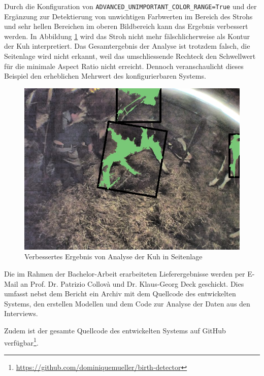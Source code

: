 Durch die Konfiguration von \texttt{ADVANCED_UNIMPORTANT_COLOR_RANGE=True} und der Ergänzung zur Detektierung von unwichtigen Farbwerten im Bereich des Strohs und sehr hellen Bereichen im oberen Bildbereich kann das Ergebnis verbessert werden. In Abbildung \ref{fig: Verbessertes Ergebnis von Analyse der Kuh in Seitenlage} wird das Stroh nicht mehr fälschlicherweise als Kontur der Kuh interpretiert. Das Gesamtergebnis der Analyse ist trotzdem falsch, die Seitenlage wird nicht erkannt, weil das umschliessende Rechteck den Schwellwert für die minimale Aspect Ratio nicht erreicht. Dennoch veranschaulicht dieses Beispiel den erheblichen Mehrwert des konfigurierbaren Systems.

\begin{figure}[H]
	\center
	\includegraphics[scale=0.5]{Grafiken/resultate/verbessertesResultat.jpg}
	\caption{Verbessertes Ergebnis von Analyse der Kuh in Seitenlage} 
	\label{fig: Verbessertes Ergebnis von Analyse der Kuh in Seitenlage} 
\end{figure}


Die im Rahmen der Bachelor-Arbeit erarbeiteten Lieferergebnisse werden per E-Mail an Prof. Dr. Patrizio Collovà und Dr. Klaus-Georg Deck geschickt. Dies umfasst nebst dem Bericht ein Archiv mit dem Quellcode des entwickelten Systems, den erstellen Modellen und dem Code zur Analyse der Daten aus den Interviews. 

Zudem ist der gesamte Quellcode des entwickelten Systems auf GitHub verfügbar\footnote{\url{https://github.com/dominiquemueller/birth-detector}}. 